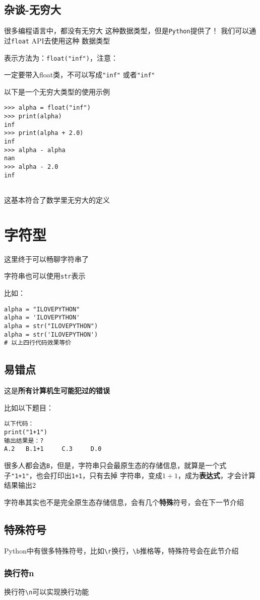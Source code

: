 \documentclass{book}
\begin{document}
\subsection{杂谈-无穷大}
\indent 很多编程语言中，都没有无穷大
这种数据类型，但是\verb|Python|提供了！
我们可以通过\verb|float| API去使用这种
数据类型


表示方法为：\verb|float("inf")|，注意：


一定要带入float类，不可以写成\verb|"inf"|
或者\verb|"inf"|


以下是一个无穷大类型的使用示例


\begin{verbatim}
>>> alpha = float("inf")
>>> print(alpha)
inf
>>> print(alpha + 2.0)
inf
>>> alpha - alpha
nan
>>> alpha - 2.0
inf
    
\end{verbatim}
这基本符合了数学里无穷大的定义
\section{字符型}
\indent 这里终于可以畅聊字符串了


字符串也可以使用\verb|str|表示


比如：
\begin{verbatim}
alpha = "ILOVEPYTHON"
alpha = 'ILOVEPYTHON'
alpha = str("ILOVEPYTHON")
alpha = str('ILOVEPYTHON')
# 以上四行代码效果等价
\end{verbatim}
\subsection{易错点}
\indent 这是\textbf{所有计算机生可能犯过的错误}


比如以下题目：
\begin{verbatim}
以下代码：
print("1+1")
输出结果是：?
A.2   B.1+1     C.3     D.0
\end{verbatim}
很多人都会选\verb|B|，但是，字符串只会最原生态的存储信息，就算是一个式子\verb|"1+1"|，也会打印出\verb|1+1|，只有去掉
字符串，变成$1+1$，成为\textbf{表达式}，才会计算结果输出$2$


字符串其实也不是完全原生态存储信息，会有几个\textbf{特殊}符号，会在下一节介绍


\subsection{特殊符号}
\indent Python中有很多特殊符号，比如\verb|\r|换行，\verb|\b|推格等，特殊符号会在此节介绍

\subsubsection{换行符n}
\indent 换行符\verb|\n|可以实现换行功能
\end{document}
